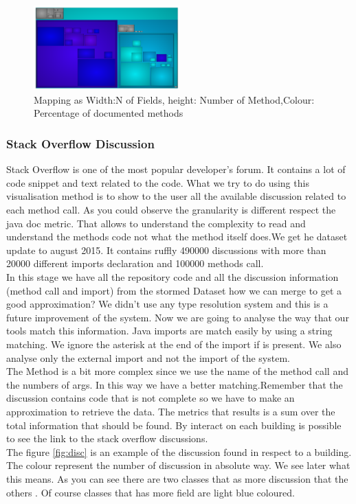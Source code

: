 \documentclass[]{usiinfbachelorproject}
\begin{document}
\begin{figure}[H]
	\centering
	\includegraphics[width=0.5\textwidth]{images/javaDocOnlyPackage}
	
	\caption[Java Documentation Mapping Only Package]{Mapping as Width:N of Fields, height: Number of Method,Colour: Percentage of documented methods\label{fig:OnlyPackage}}
\end{figure}


\subsubsection{Stack Overflow  Discussion}
Stack Overflow is one of the most popular developer's forum. It contains a lot of code snippet and text related to the code. What we try to do using this visualisation method is to show to the user all the available discussion related to each method call. As you could observe the granularity is different respect the java doc metric. That allows to understand the complexity to read and understand the methods code not what the method itself does.We get he dataset update to august  2015. It contains ruffly 490000 discussions with more than 20000 different imports declaration and 100000 methods call.\\
In this stage we have all the repository code and all the discussion information (method call and import) from the stormed Dataset how we can merge to get a good approximation? We didn't use any type resolution system and this is a future improvement of the system. Now we are going to analyse the way that our tools match this information.
Java imports are match easily by using a string matching. We ignore the asterisk at the end of the import if is present. 
We also analyse only the external import and not the import of the system.\\
The Method is a bit more complex since we use the name of the method call and the numbers of args. In this way we have a better matching.Remember that the discussion contains code that is not complete so we have to make an approximation to retrieve the data.
The metrics that results is a sum over the total information that should be found. By interact on each building is possible to see the link to the stack overflow discussions.\\
The figure \ref{fig:disc}  is an example of the discussion found in respect to a building. The colour represent the number of discussion in absolute way. We see later what this means. As you can see there are two classes that as more discussion that the others . Of course classes that has more field are light blue coloured.
\end{document}
